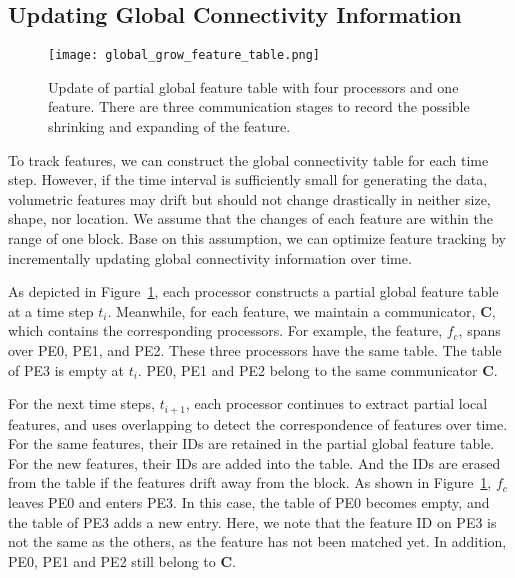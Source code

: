 \subsection{Updating Global Connectivity Information}

\begin{figure}[t]
	\centering
	\texttt{[image: global\_grow\_feature\_table.png]}
	\caption{Update of partial global feature table with four processors and one feature. There are three communication stages to record the possible shrinking and expanding of the feature. }
	\label{fig:hybrid}
\end{figure}

To track features, we can construct the global connectivity table for each time step. However, if the time interval is sufficiently small for generating the data, volumetric features may drift but should not change drastically in neither size, shape, nor location. We assume that the changes of each feature are within the range of one block. Base on this assumption, we can optimize feature tracking by incrementally updating global connectivity information over time.

As depicted in Figure~\ref{fig:hybrid}, each processor constructs a partial global feature table at a time step $t_i$. Meanwhile, for each feature, we maintain a communicator, $\textbf{C}$, which contains the corresponding processors. For example, the feature, $f_c$, spans over PE0, PE1, and PE2. These three processors have the same table. The table of PE3 is empty at $t_i$. PE0, PE1 and PE2 belong to the same communicator $\textbf{C}$.

For the next time steps, $t_{i+1}$, each processor continues to extract partial local features, and uses overlapping to detect the correspondence of features over time. For the same features, their IDs are retained in the partial global feature table. For the new features, their IDs are added into the table. And the IDs are erased from the table if the features drift away from the block. As shown in Figure~\ref{fig:hybrid}, $f_c$ leaves PE0 and enters PE3. In this case, the table of PE0 becomes empty, and the table of PE3 adds a new entry. Here, we note that the feature ID on PE3 is not the same as the others, as the feature has not been matched yet. In addition, PE0, PE1 and PE2 still belong to $\textbf{C}$.

